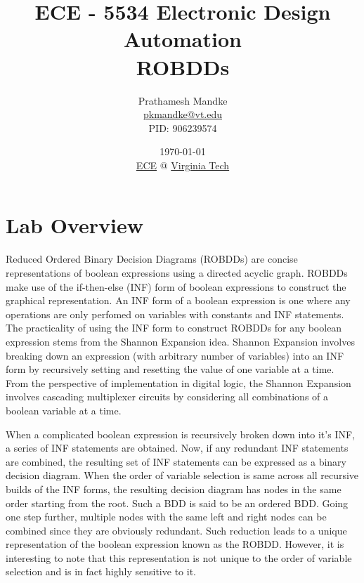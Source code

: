 \documentclass[a4paper, titlepage, 12pt]{article}
\numberwithin{equation}{section}
\begin{document}
    \title{ECE - 5534 Electronic Design Automation \\ ROBDDs}
    \author{Prathamesh Mandke \\ \href{pkmandke@vt.edu}{pkmandke@vt.edu} \\ PID: 906239574}
    \date{\today \\ \href{https://ece.vt.edu}{ECE} @ \href{https://vt.edu}{Virginia Tech}}
    \maketitle
    \newpage

    \section{Lab Overview}

        Reduced Ordered Binary Decision Diagrams (ROBDDs) are concise representations of boolean expressions using a directed acyclic graph.
        ROBDDs make use of the if-then-else (INF) form of boolean expressions to construct the graphical representation.
        An INF form of a boolean expression is one where any operations are only perfomed on variables with constants and INF statements.
        The practicality of using the INF form to construct ROBDDs for any boolean expression stems from the Shannon Expansion idea.
        Shannon Expansion involves breaking down an expression (with arbitrary number of variables) into an INF form by recursively setting and resetting the value of one variable at a time.
        From the perspective of implementation in digital logic, the Shannon Expansion involves cascading multiplexer circuits by considering all combinations of a boolean variable at a time.
        
        When a complicated boolean expression is recursively broken down into it's INF, a series of INF statements are obtained.
        Now, if any redundant INF statements are combined, the resulting set of INF statements can be expressed as a binary decision diagram.
        When the order of variable selection is same across all recursive builds of the INF forms, the resulting decision diagram has nodes in the same order starting from the root.
        Such a BDD is said to be an ordered BDD.
        Going one step further, multiple nodes with the same left and right nodes can be combined since they are obviously redundant.
        Such reduction leads to a unique representation of the boolean expression known as the ROBDD.
        However, it is interesting to note that this representation is not unique to the order of variable selection and is in fact highly sensitive to it.
        
\end{document}

